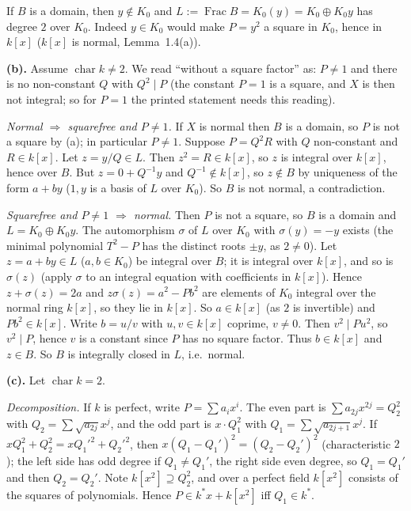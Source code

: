 \documentclass[11pt]{article}
\begin{document}
If $B$ is a domain, then $y\notin K_0$ and $L:=\operatorname{Frac}B=K_0(y)=K_0\oplus K_0y$ has degree $2$ over $K_0$. Indeed $y\in K_0$ would make $P=y^2$ a square in $K_0$, hence in $k[x]$ ($k[x]$ is normal, Lemma~1.4(a)).

\textbf{(b).} Assume $\operatorname{char}k\neq2$. We read ``without a square factor'' as: $P\neq1$ and there is no non-constant $Q$ with $Q^2\mid P$ (the constant $P=1$ is a square, and $X$ is then not integral; so for $P=1$ the printed statement needs this reading).

\emph{Normal $\Rightarrow$ squarefree and $P\neq1$.} If $X$ is normal then $B$ is a domain, so $P$ is not a square by (a); in particular $P\ne1$. Suppose $P=Q^2R$ with $Q$ non-constant and $R\in k[x]$. Let $z=y/Q\in L$. Then $z^2=R\in k[x]$, so $z$ is integral over $k[x]$, hence over $B$. But $z=0+Q^{-1}y$ and $Q^{-1}\notin k[x]$, so $z\notin B$ by uniqueness of the form $a+by$ ($1,y$ is a basis of $L$ over $K_0$). So $B$ is not normal, a contradiction.

\emph{Squarefree and $P\neq1$ $\Rightarrow$ normal.} Then $P$ is not a square, so $B$ is a domain and $L=K_0\oplus K_0y$. The automorphism $\sigma$ of $L$ over $K_0$ with $\sigma(y)=-y$ exists (the minimal polynomial $T^2-P$ has the distinct roots $\pm y$, as $2\ne0$). Let $z=a+by\in L$ ($a,b\in K_0$) be integral over $B$; it is integral over $k[x]$, and so is $\sigma(z)$ (apply $\sigma$ to an integral equation with coefficients in $k[x]$). Hence $z+\sigma(z)=2a$ and $z\sigma(z)=a^2-Pb^2$ are elements of $K_0$ integral over the normal ring $k[x]$, so they lie in $k[x]$. So $a\in k[x]$ (as $2$ is invertible) and $Pb^2\in k[x]$. Write $b=u/v$ with $u,v\in k[x]$ coprime, $v\ne0$. Then $v^2\mid Pu^2$, so $v^2\mid P$, hence $v$ is a constant since $P$ has no square factor. Thus $b\in k[x]$ and $z\in B$. So $B$ is integrally closed in $L$, i.e.\ normal.

\textbf{(c).} Let $\operatorname{char}k=2$.

\emph{Decomposition.} If $k$ is perfect, write $P=\sum a_ix^i$. The even part is $\sum a_{2j}x^{2j}=Q_2^2$ with $Q_2=\sum\sqrt{a_{2j}}x^j$, and the odd part is $x\cdot Q_1^2$ with $Q_1=\sum\sqrt{a_{2j+1}}x^j$. If $xQ_1^2+Q_2^2=xQ_1'^2+Q_2'^2$, then $x(Q_1-Q_1')^2=(Q_2-Q_2')^2$ (characteristic $2$); the left side has odd degree if $Q_1\ne Q_1'$, the right side even degree, so $Q_1=Q_1'$ and then $Q_2=Q_2'$. Note $k[x^2]\supseteq Q_2^2$, and over a perfect field $k[x^2]$ consists of the squares of polynomials. Hence $P\in k^*x+k[x^2]$ iff $Q_1\in k^*$.
\end{document}
